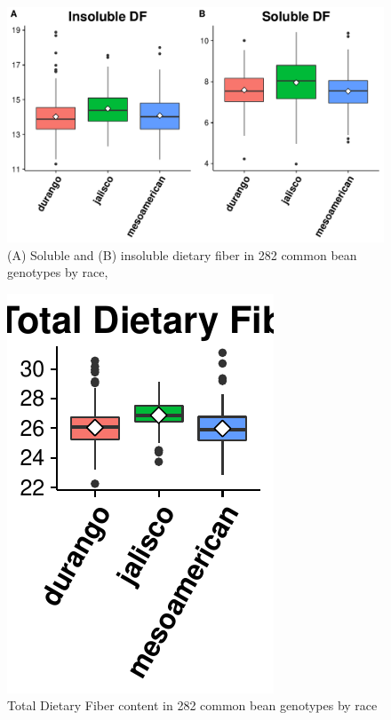 \documentclass[11pt,]{article}
\makeatletter
\def\maxwidth{\ifdim\Gin@nat@width>\linewidth\linewidth
\else\Gin@nat@width\fi}
\let\Oldincludegraphics\includegraphics
\renewcommand{\includegraphics}[1]{\Oldincludegraphics[width=\maxwidth]{#1}}
\makeatother
\begin{document}
\begin{figure}

{\centering \includegraphics{./manuscript_template_files/figure-latex/unnamed-chunk-15-1} 

}

\caption{(A) Soluble and (B) insoluble dietary fiber in 282 common bean genotypes by race,}\label{fig:unnamed-chunk-15}
\end{figure}

\begin{figure}

{\centering \includegraphics{./manuscript_template_files/figure-latex/unnamed-chunk-16-1} 

}

\caption{Total Dietary Fiber content in 282 common bean genotypes by race}\label{fig:unnamed-chunk-16}
\end{figure}
\newpage 
\end{document}
